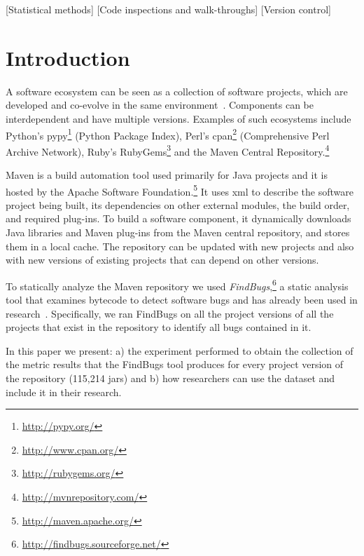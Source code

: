 \documentclass{sig-alternate}
\begin{document}
[Statistical methods]
[Code inspections and walk-throughs]
[Version control]



\section{Introduction}
\label{sec:intro}

A software ecosystem can be seen as a collection of software projects,
which are developed and co-evolve in the same environment~\cite{LL10}.
Components can be interdependent and have multiple versions.
Examples of such ecosystems include Python's
{\sc p}y{\sc py}\footnote{\url{http://pypy.org/}}
(Python Package Index), Perl's
{\sc cpan}\footnote{\url{http://www.cpan.org/}}
(Comprehensive Perl Archive Network), Ruby's
RubyGems\footnote{\url{http://rubygems.org/}}
and the Maven Central Repository.\footnote{\url{http://mvnrepository.com/}}

Maven is a build automation tool used primarily for Java projects and it is
hosted by the Apache Software Foundation.\footnote{\url{http://maven.apache.org/}}
It uses {\sc xml} to describe the software project being built, its dependencies
on other external modules, the build order, and required plug-ins.
To build a software component, it dynamically downloads Java libraries
and Maven plug-ins from the Maven central repository,
and stores them in a local cache. The repository can be updated with
new projects and also with new versions of existing projects
that can depend on other versions.

To statically analyze the Maven repository
we used {\it FindBugs},\footnote{\url{http://findbugs.sourceforge.net/}}
a static analysis tool that examines bytecode to detect software bugs
and has already been used in research~\cite{AP10,SHP06}.
Specifically, we ran FindBugs on all the project versions of all
the projects that exist in the repository
to identify all bugs contained in it.

In this paper we present: a) the experiment performed to obtain the
collection of the metric results that the FindBugs tool produces 
for every project version of the repository (115,214 {\sc jar}s)
and b) how researchers can use the dataset and include it in their research.
\end{document}
